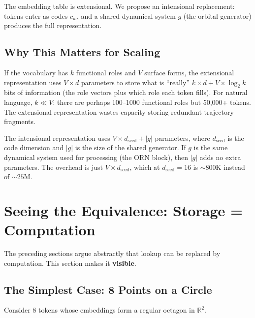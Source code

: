 \documentclass[11pt, a4paper]{article}
\newcommand{\R}{\mathbb{R}}
\theoremstyle{remark}
\begin{document}
The embedding table is extensional.
We propose an intensional replacement: tokens enter as codes $c_w$, and a shared dynamical system $g$ (the orbital generator) produces the full representation.

\subsection{Why This Matters for Scaling}

If the vocabulary has $k$ functional roles and $V$ surface forms, the extensional representation uses $V \times d$ parameters to store what is ``really'' $k \times d + V \times \log_2 k$ bits of information (the role vectors plus which role each token fills).
For natural language, $k \ll V$: there are perhaps 100--1000 functional roles but 50,000+ tokens.
The extensional representation wastes capacity storing redundant trajectory fragments.

The intensional representation uses $V \times d_{\text{seed}} + |g|$ parameters, where $d_{\text{seed}}$ is the code dimension and $|g|$ is the size of the shared generator.
If $g$ is the same dynamical system used for processing (the ORN block), then $|g|$ adds no extra parameters.
The overhead is just $V \times d_{\text{seed}}$, which at $d_{\text{seed}} = 16$ is $\sim 800$K instead of $\sim 25$M.


\section{Seeing the Equivalence: Storage = Computation}

The preceding sections argue abstractly that lookup can be replaced by computation.
This section makes it \textbf{visible}.

\subsection{The Simplest Case: 8 Points on a Circle}

Consider 8 tokens whose embeddings form a regular octagon in $\R^2$.
\end{document}
